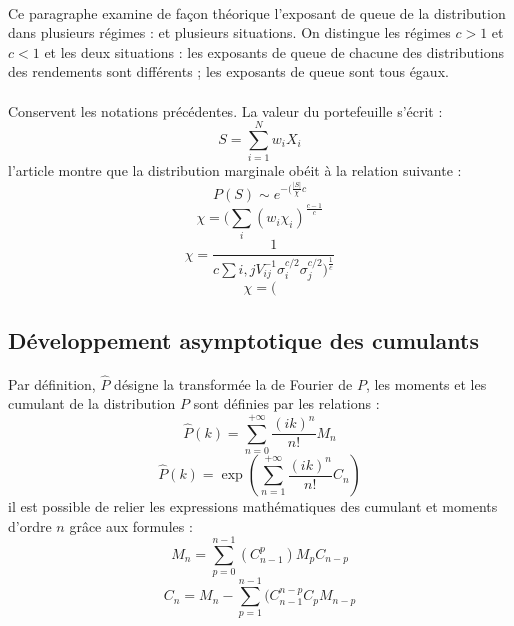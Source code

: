 \documentclass{article}
\begin{document}
\paragraph{}   
   Ce paragraphe examine de façon théorique l'exposant de queue de la distribution dans plusieurs régimes : et plusieurs situations. On distingue les régimes $ c>1 $ et $ c<1 $ et les deux situations : les exposants de queue de chacune des distributions des rendements sont différents ; les exposants de queue sont tous égaux.
\paragraph{}
 Conservent les notations précédentes. La valeur du portefeuille s'écrit :
 \begin{equation}
 S=\sum ^{N}_{i=1}w_{i}X_{i}
 \end{equation}
    l'article montre que la distribution marginale obéit à la relation suivante : 
    \begin{equation}
	P(S)\sim e^{-(\frac{\vert S \vert}{\chi}c}
    \end{equation}
    \begin{equation}
    \chi =(\sum _{i}(w_{i}\chi _{i})^{\frac{c-1}{c}}
    \end{equation}
    \begin{equation}
    \chi = \frac{1}{c\sum i,jV_{ij}^{-1}\sigma_{i}^{c/2}\sigma ^{c/2}_{j})^{\frac{1}{c}}}
    \end{equation}
    \begin{equation}
    \chi =(
    \end{equation}
 \subsection{Développement asymptotique des cumulants}
\paragraph{}         
       Par définition, $ \widehat{P} $ désigne la transformée la de Fourier de $P$, les moments et les cumulant de la distribution $P$ sont définies par les relations :
       \begin{equation}
       \widehat{P}(k)=\sum _{n=0}^{+\infty }\frac{(ik)^{n}}{n!}M_{n}
       \end{equation}
       \begin{equation}
       \widehat{P}(k)=\exp(\sum _{n=1}^{+\infty }\frac{(ik)^{n}}{n!}C_{n})
       \end{equation}
        il est possible de relier les expressions mathématiques des cumulant et moments d'ordre $n$ grâce aux formules :
    \begin{equation}
    M_{n}=\sum ^{n-1}_{p=0}(C^{p}_{n-1})M_{p}C_{n-p}
    \end{equation}
    \begin{equation}
    C_{n}=M_{n}-\sum ^{n-1}_{p=1}(C_{n-1}^{n-p}C_{p}M_{n-p}
    \end{equation}
\end{document}
